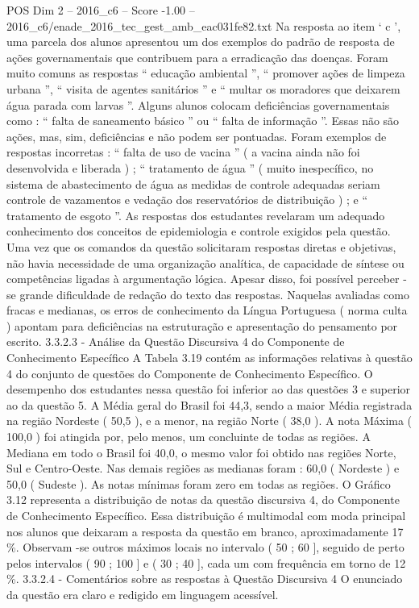 \begin{textsample}{POS Dim 2 – 2016\_c6 – Score -1.00 – 2016\_c6/enade\_2016\_tec\_gest\_amb\_eac031fe82.txt}
Na resposta ao item ‘ c ’, uma parcela dos alunos apresentou um dos exemplos do padrão de resposta de ações governamentais que contribuem para a erradicação das doenças.
Foram muito comuns as respostas “ educação ambiental ”, “ promover ações de limpeza urbana ”, “ visita de agentes sanitários ” e “ multar os moradores que deixarem água parada com larvas ”.
Alguns alunos colocam deficiências governamentais como : “ falta de saneamento básico ” ou “ falta de informação ”.
Essas não são ações, mas, sim, deficiências e não podem ser pontuadas.
Foram exemplos de respostas incorretas : “ falta de uso de vacina ” ( a vacina ainda não foi desenvolvida e liberada ) ; “ tratamento de água ” ( muito inespecífico, no sistema de abastecimento de água as medidas de controle adequadas seriam controle de vazamentos e vedação dos reservatórios de distribuição ) ; e “ tratamento de esgoto ”.
As respostas dos estudantes revelaram um adequado conhecimento dos conceitos de epidemiologia e controle exigidos pela questão.
Uma vez que os comandos da questão solicitaram respostas diretas e objetivas, não havia necessidade de uma organização analítica, de capacidade de síntese ou competências ligadas à argumentação lógica.
Apesar disso, foi possível perceber -se grande dificuldade de redação do texto das respostas.
Naquelas avaliadas como fracas e medianas, os erros de conhecimento da Língua Portuguesa ( norma culta ) apontam para deficiências na estruturação e apresentação do pensamento por escrito. 3.3.2.3 - Análise da Questão Discursiva 4 do Componente de Conhecimento Específico A Tabela 3.19 contém as informações relativas à questão 4 do conjunto de questões do Componente de Conhecimento Específico.
O desempenho dos estudantes nessa questão foi inferior ao das questões 3 e superior ao da questão 5.
A Média geral do Brasil foi 44,3, sendo a maior Média registrada na região Nordeste ( 50,5 ), e a menor, na região Norte ( 38,0 ).
A nota Máxima ( 100,0 ) foi atingida por, pelo menos, um concluinte de todas as regiões.
A Mediana em todo o Brasil foi 40,0, o mesmo valor foi obtido nas regiões Norte, Sul e Centro-Oeste.
Nas demais regiões as medianas foram : 60,0 ( Nordeste ) e 50,0 ( Sudeste ).
As notas mínimas foram zero em todas as regiões.
O Gráfico 3.12 representa a distribuição de notas da questão discursiva 4, do Componente de Conhecimento Específico.
Essa distribuição é multimodal com moda principal nos alunos que deixaram a resposta da questão em branco, aproximadamente 17 \%.
Observam -se outros máximos locais no intervalo ( 50 ; 60 ], seguido de perto pelos intervalos ( 90 ; 100 ] e ( 30 ; 40 ], cada um com frequência em torno de 12 \%. 3.3.2.4 - Comentários sobre as respostas à Questão Discursiva 4 O enunciado da questão era claro e redigido em linguagem acessível.

\end{textsample}

